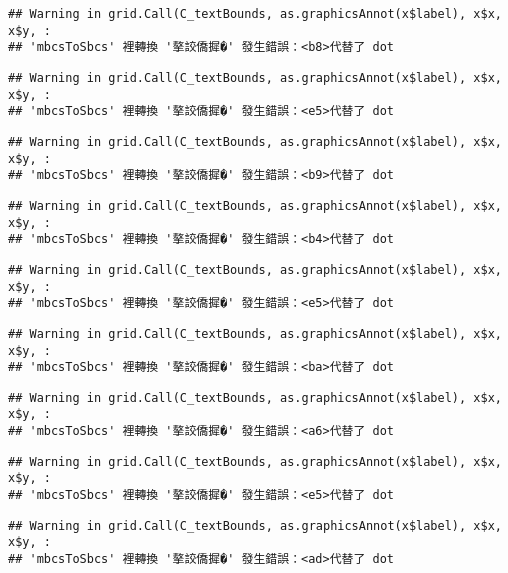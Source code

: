 \documentclass[
]{article}
\begin{document}
\begin{verbatim}
## Warning in grid.Call(C_textBounds, as.graphicsAnnot(x$label), x$x, x$y, :
## 'mbcsToSbcs' 裡轉換 '摮詨僑摨�' 發生錯誤：<b8>代替了 dot
\end{verbatim}

\begin{verbatim}
## Warning in grid.Call(C_textBounds, as.graphicsAnnot(x$label), x$x, x$y, :
## 'mbcsToSbcs' 裡轉換 '摮詨僑摨�' 發生錯誤：<e5>代替了 dot
\end{verbatim}

\begin{verbatim}
## Warning in grid.Call(C_textBounds, as.graphicsAnnot(x$label), x$x, x$y, :
## 'mbcsToSbcs' 裡轉換 '摮詨僑摨�' 發生錯誤：<b9>代替了 dot
\end{verbatim}

\begin{verbatim}
## Warning in grid.Call(C_textBounds, as.graphicsAnnot(x$label), x$x, x$y, :
## 'mbcsToSbcs' 裡轉換 '摮詨僑摨�' 發生錯誤：<b4>代替了 dot
\end{verbatim}

\begin{verbatim}
## Warning in grid.Call(C_textBounds, as.graphicsAnnot(x$label), x$x, x$y, :
## 'mbcsToSbcs' 裡轉換 '摮詨僑摨�' 發生錯誤：<e5>代替了 dot
\end{verbatim}

\begin{verbatim}
## Warning in grid.Call(C_textBounds, as.graphicsAnnot(x$label), x$x, x$y, :
## 'mbcsToSbcs' 裡轉換 '摮詨僑摨�' 發生錯誤：<ba>代替了 dot
\end{verbatim}

\begin{verbatim}
## Warning in grid.Call(C_textBounds, as.graphicsAnnot(x$label), x$x, x$y, :
## 'mbcsToSbcs' 裡轉換 '摮詨僑摨�' 發生錯誤：<a6>代替了 dot
\end{verbatim}

\begin{verbatim}
## Warning in grid.Call(C_textBounds, as.graphicsAnnot(x$label), x$x, x$y, :
## 'mbcsToSbcs' 裡轉換 '摮詨僑摨�' 發生錯誤：<e5>代替了 dot
\end{verbatim}

\begin{verbatim}
## Warning in grid.Call(C_textBounds, as.graphicsAnnot(x$label), x$x, x$y, :
## 'mbcsToSbcs' 裡轉換 '摮詨僑摨�' 發生錯誤：<ad>代替了 dot
\end{verbatim}
\end{document}
